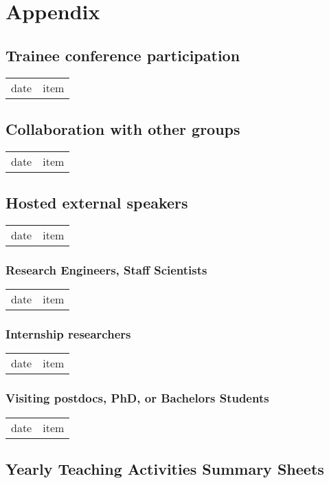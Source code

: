 \chapter{Appendix}
\label{app}

\vspace{-10mm}

\section{Trainee conference participation}

\begin{tabular}[l]{ p{} p{} }
date & item\\
\end{tabular} 



\section{Collaboration with other groups}

\begin{tabular}[l]{ p{} p{} }
date & item\\
\end{tabular} 



\section{Hosted external speakers}
\begin{tabular}[l]{ p{} p{} }
date & item\\
\end{tabular} 

\subsection{Research Engineers, Staff Scientists}
\begin{tabular}[l]{ p{} p{} }
date & item\\
\end{tabular} 

\subsection{Internship researchers}
\begin{tabular}[l]{ p{} p{} }
date & item\\
\end{tabular} 

\subsection{Visiting postdocs, PhD, or Bachelors Students}
\begin{tabular}[l]{ p{} p{} }
date & item\\
\end{tabular} 

\section{Yearly Teaching Activities Summary Sheets}
\label{app:otherTeaching}





